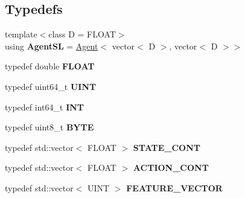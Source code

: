 \subsection*{Typedefs}
\begin{DoxyCompactItemize}
\item 
\hypertarget{namespaceAI_a396512a76bd06c4a9f2e458006cdbe62}{{\footnotesize template$<$class D  = F\-L\-O\-A\-T$>$ }\\using {\bfseries Agent\-S\-L} = \hyperlink{classAI_1_1Agent}{Agent}$<$ vector$<$ D $>$, vector$<$ D $>$$>$}\label{namespaceAI_a396512a76bd06c4a9f2e458006cdbe62}

\item 
\hypertarget{namespaceAI_a41b74884a20833db653dded3918e05c3}{typedef double {\bfseries F\-L\-O\-A\-T}}\label{namespaceAI_a41b74884a20833db653dded3918e05c3}

\item 
\hypertarget{namespaceAI_ab6e14dc1e659854858a87e511f1439ec}{typedef uint64\-\_\-t {\bfseries U\-I\-N\-T}}\label{namespaceAI_ab6e14dc1e659854858a87e511f1439ec}

\item 
\hypertarget{namespaceAI_ac74584e573f07aa4194b461b1ba7be64}{typedef int64\-\_\-t {\bfseries I\-N\-T}}\label{namespaceAI_ac74584e573f07aa4194b461b1ba7be64}

\item 
\hypertarget{namespaceAI_a9d4bcda82fe0f9aac3c4861e24491581}{typedef uint8\-\_\-t {\bfseries B\-Y\-T\-E}}\label{namespaceAI_a9d4bcda82fe0f9aac3c4861e24491581}

\item 
\hypertarget{namespaceAI_aff63ec21d97dd5f086fddbc3103f5707}{typedef std\-::vector$<$ F\-L\-O\-A\-T $>$ {\bfseries S\-T\-A\-T\-E\-\_\-\-C\-O\-N\-T}}\label{namespaceAI_aff63ec21d97dd5f086fddbc3103f5707}

\item 
\hypertarget{namespaceAI_a143ffd7216e2cf8fc6d92e4efdb647a7}{typedef std\-::vector$<$ F\-L\-O\-A\-T $>$ {\bfseries A\-C\-T\-I\-O\-N\-\_\-\-C\-O\-N\-T}}\label{namespaceAI_a143ffd7216e2cf8fc6d92e4efdb647a7}

\item 
\hypertarget{namespaceAI_a3ff136db55380e4b24a6234c1693f1e9}{typedef std\-::vector$<$ U\-I\-N\-T $>$ {\bfseries F\-E\-A\-T\-U\-R\-E\-\_\-\-V\-E\-C\-T\-O\-R}}\label{namespaceAI_a3ff136db55380e4b24a6234c1693f1e9}

\end{DoxyCompactItemize}
